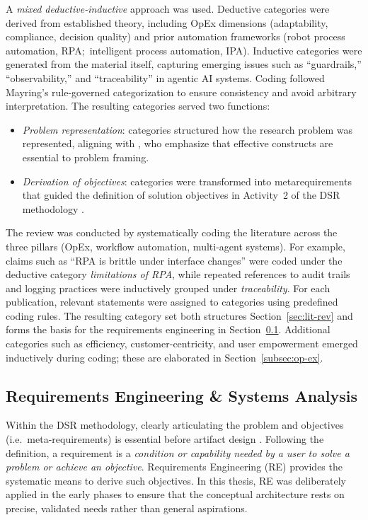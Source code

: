 A \emph{mixed deductive-inductive} approach was used. Deductive categories were derived from established theory, including OpEx dimensions (adaptability, compliance, decision quality) and prior automation frameworks (robot process automation, RPA;~intelligent process automation, IPA). Inductive categories were generated from the material itself, capturing emerging issues such as ``guardrails,'' ``observability,'' and ``traceability'' in agentic AI systems.  Coding followed Mayring's rule-governed categorization to ensure consistency and avoid arbitrary interpretation. The resulting categories served two functions:
\begin{itemize}
    \item \textit{Problem representation}: categories structured how the research problem was represented, aligning with \textcite{hevnerDesign2004}, who emphasize that effective constructs are essential to problem framing.
    \item \textit{Derivation of objectives}: categories were transformed into metarequirements that guided the definition of solution objectives in Activity~2 of the DSR methodology \parencite{peffersDesign2007}.
\end{itemize}

The review was conducted by systematically coding the literature across the three pillars (OpEx, workflow automation, multi-agent systems). 
For example, claims such as ``RPA is brittle under interface changes'' were coded under the deductive category \emph{limitations of RPA}, 
while repeated references to audit trails and logging practices were inductively grouped under \emph{traceability}. 
For each publication, relevant statements were assigned to categories using predefined coding rules. 
The resulting category set both structures Section~\ref{sec:lit-rev} and forms the basis for the requirements engineering in Section~\ref{subsec:re-sa}. Additional categories such as efficiency, customer-centricity, and user empowerment emerged inductively during coding; these are elaborated in Section~\ref{subsec:op-ex}.

\subsection{Requirements Engineering \& Systems Analysis}\label{subsec:re-sa}
Within the DSR methodology, clearly articulating the problem and objectives (i.e.~meta-requirements) is essential before artifact design \parencite{hevnerDesign2004,peffersDesign2007}. Following the \textcite{IEEEStandard1990} definition, a requirement is a \emph{condition or capability needed by a user to solve a problem or achieve an objective}. Requirements Engineering (RE) provides the systematic means to derive such objectives. In this thesis, RE was deliberately applied in the early phases to ensure that the conceptual architecture rests on precise, validated needs rather than general aspirations.

